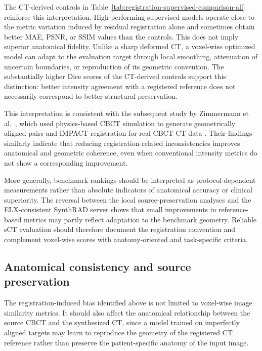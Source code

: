 \documentclass[lettersize,journal]{IEEEtran}
\begin{document}
The CT-derived controls in Table~\ref{tab:registration-supervised-comparison-all} reinforce this interpretation. High-performing supervised models operate close to the metric variation induced by residual registration alone and sometimes obtain better MAE, PSNR, or SSIM values than the controls. This does not imply superior anatomical fidelity. Unlike a sharp deformed CT, a voxel-wise optimized model can adapt to the evaluation target through local smoothing, attenuation of uncertain boundaries, or reproduction of its geometric convention. The substantially higher Dice scores of the CT-derived controls support this distinction: better intensity
agreement with a registered reference does not necessarily correspond to better structural preservation.

This interpretation is consistent with the subsequent study by Zimmermann et al.~\cite{zimmermann2026eliminating}, which used physics-based CBCT simulation to generate geometrically aligned pairs and IMPACT registration for real CBCT-CT data \cite{boussot2025impact}. Their findings similarly indicate that reducing registration-related inconsistencies improves anatomical and geometric coherence, even when conventional intensity metrics do not show a corresponding improvement.

More generally, benchmark rankings should be interpreted as protocol-dependent measurements rather than absolute indicators of anatomical accuracy or clinical superiority. The reversal between the local source-preservation analyses and the ELX-consistent SynthRAD server shows that small improvements in reference-based metrics may partly reflect adaptation to the benchmark geometry. Reliable sCT evaluation should therefore document the registration convention and complement voxel-wise scores with anatomy-oriented and task-specific criteria.

\subsection{Anatomical consistency and source preservation} 

The registration-induced bias identified above is not limited to voxel-wise image similarity metrics. It should also affect the anatomical relationship between the source CBCT and the synthesized CT, since a model trained on imperfectly aligned targets may learn to reproduce the geometry of the registered CT reference rather than preserve the patient-specific anatomy of the input image.
\end{document}
